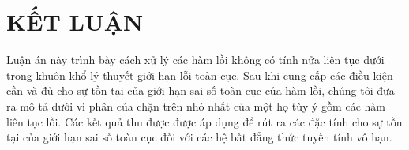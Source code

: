 \chapter*{KẾT LUẬN}

Luận án này trình bày cách xử lý các hàm lồi không có tính nửa liên tục dưới trong khuôn khổ lý thuyết giới hạn lỗi toàn cục. Sau khi cung cấp các điều kiện cần và đủ cho sự tồn tại của giới hạn sai số toàn cục của hàm lồi, chúng tôi đưa ra mô tả dưới vi phân của chặn trên nhỏ nhất của một họ tùy ý gồm các hàm liên tục lồi. Các kết quả thu được được áp dụng để rút ra các đặc tính cho sự tồn tại của giới hạn sai số toàn cục đối với các hệ bất đẳng thức tuyến tính vô hạn.
